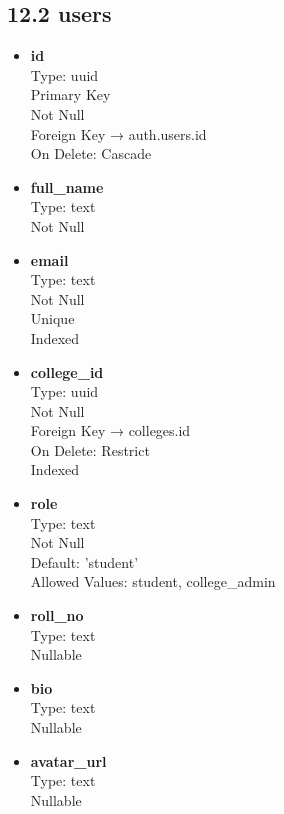 \documentclass[12pt]{article}
\begin{document}
\subsection*{12.2 users}

\begin{itemize}
    \item \textbf{id} \\
    Type: uuid \\
    Primary Key \\
    Not Null \\
    Foreign Key → auth.users.id \\
    On Delete: Cascade

    \item \textbf{full\_name} \\
    Type: text \\
    Not Null

    \item \textbf{email} \\
    Type: text \\
    Not Null \\
    Unique \\
    Indexed

    \item \textbf{college\_id} \\
    Type: uuid \\
    Not Null \\
    Foreign Key → colleges.id \\
    On Delete: Restrict \\
    Indexed

    \item \textbf{role} \\
    Type: text \\
    Not Null \\
    Default: 'student' \\
    Allowed Values: student, college\_admin

    \item \textbf{roll\_no} \\
    Type: text \\
    Nullable

    \item \textbf{bio} \\
    Type: text \\
    Nullable

    \item \textbf{avatar\_url} \\
    Type: text \\
    Nullable
\end{itemize}
\end{document}
